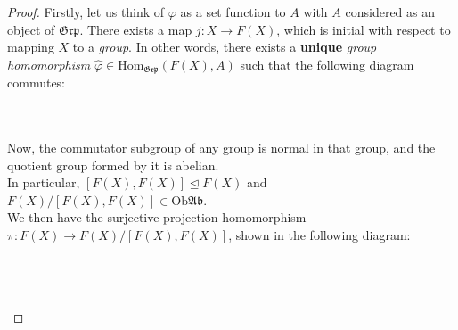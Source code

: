 \documentclass[12pt,letterpaper]{article}
\begin{document}
\begin{proof}
	Firstly, let us think of $\varphi$ as a set function to $A$ with $A$ considered as an object of $\mathfrak{Grp}$. There exists a map $j:X\rightarrow F(X)$, which is initial with respect to mapping $X$ to a \textit{group}. In other words, there exists a \textbf{unique} \textit{group homomorphism} $\hat\varphi\in\mathrm{Hom}_{\mathfrak{Grp}}(F(X),A)$ such that the following diagram commutes:\\
		\\\\
		
	Now, the commutator subgroup of any group is normal in that group, and the quotient group formed by it is abelian.\\ 
	In particular, $[F(X), F(X)] \trianglelefteq F(X)$ and $F(X)/[F(X),F(X)] \in \mathrm{Ob }\mathfrak{Ab}$.\\
	We then have the surjective projection homomorphism $\pi : F(X) \rightarrow F(X)/[F(X),F(X)]$, shown in the following diagram:\\\\
		\\\\
		

\end{proof}
\end{document}
